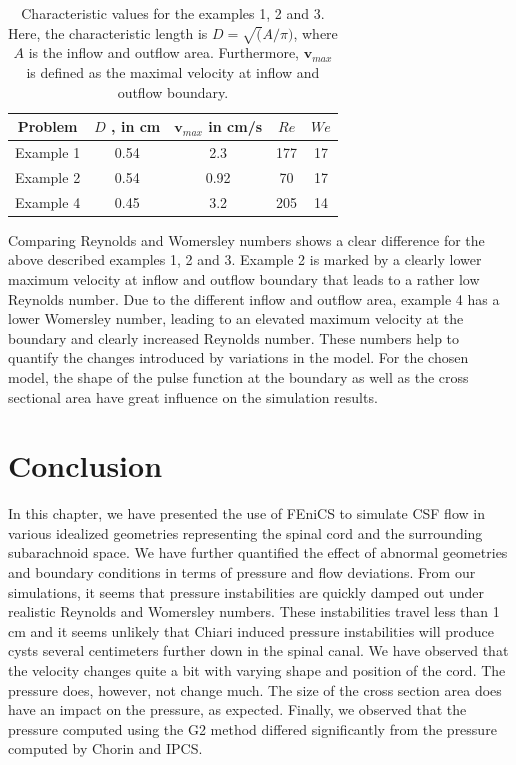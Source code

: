 \begin{table}
\begin{center}
\begin{tabular}{ | c | c | c | c | c |}
\hline
Problem & $D$ ,  in cm & $\mathbf{v}_{max}$ in cm/s  & $Re$ & $We$ \\ \hline\hline
	Example 1 	&	0.54 & 2.3 & 177 & 17	\\ \hline
	Example 2	&	0.54 & 0.92 & 70 & 17	\\ \hline
	Example 4	&	0.45 & 3.2 	& 205 & 14	\\ \hline
    \end{tabular}
	\label{tab:Re_We}
	\caption{Characteristic values for the examples 1, 2 and 3. Here, the
	characteristic length is $D=\sqrt(A/\pi)$, where  $A$ is the inflow and outflow area.
        Furthermore, $\mathbf{v}_{max}$ is defined as the maximal velocity at inflow and outflow boundary.
	}
\end{center}\end{table}

Comparing Reynolds and Womersley numbers shows a clear difference for
the above described examples 1, 2 and 3. Example 2 is marked by a
clearly lower maximum velocity at inflow and outflow boundary that
leads to a rather low Reynolds number. Due to the different inflow and
outflow area, example 4 has a lower Womersley number, leading to an
elevated maximum velocity at the boundary and clearly increased
Reynolds number. These numbers help to quantify the changes introduced
by variations in the model. For the chosen model, the shape of the
pulse function at the boundary as well as the cross sectional area
have great influence on the simulation results.

\section{Conclusion}

In this chapter, we have presented the use of FEniCS to simulate CSF
flow in various idealized geometries representing the spinal cord and
the surrounding subarachnoid space. We have further quantified the
effect of abnormal geometries and boundary conditions in terms of
pressure and flow deviations. From our simulations, it seems that
pressure instabilities are quickly damped out under realistic Reynolds
and Womersley numbers. These instabilities travel less than 1 cm and
it seems unlikely that Chiari induced pressure instabilities will
produce cysts several centimeters further down in the spinal canal.
We have observed that the velocity changes quite a bit with varying
shape and position of the cord. The pressure does, however, not change
much. The size of the cross section area does have an impact on the
pressure, as expected.  Finally, we observed that the pressure
computed using the G2 method differed significantly from the pressure
computed by Chorin and IPCS.
